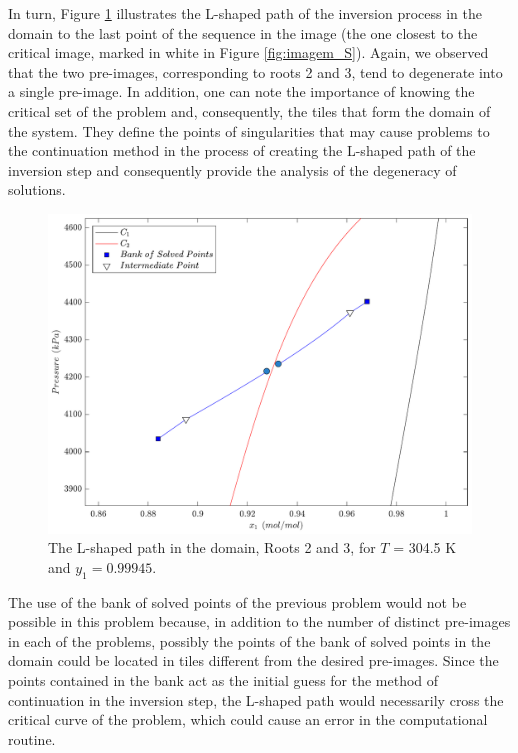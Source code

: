 \documentclass[journal=iecred,manuscript=article]{achemso}
\theoremstyle{definition}
\theoremstyle{remark}
\begin{document}
In turn, Figure \ref{fig:L_S} illustrates the L-shaped path of the inversion process in the domain to the last point of the sequence in the image (the one closest to the critical image, marked in white in Figure \ref{fig:imagem_S}). Again, we observed that the two pre-images, corresponding to roots 2 and 3, tend to degenerate into a single pre-image. In addition, one can note the importance of knowing the critical set of the problem and, consequently, the tiles that form the domain of the system. They define the points of singularities that may cause problems to the continuation method in the process of creating the L-shaped path of the inversion step and consequently provide the analysis of the degeneracy of solutions.

\begin{figure}[!ht]
	\begin{center}
		\includegraphics[scale=0.50]{caminhos_L_degeneracao_dominio2.pdf}
		\caption{The L-shaped path in the domain, Roots 2 and 3, for $T$ = 304.5 K and $y_1 = 0.99945$.}\label{fig:L_S}
	\end{center}
\end{figure}

The use of the bank of solved points of the previous problem would not be possible in this problem because, in addition to the number of distinct pre-images in each of the problems, possibly the points of the bank of solved points in the domain could be located in tiles different from the desired pre-images. Since the points contained in the bank act as the initial guess for the method of continuation in the inversion step, the L-shaped path would necessarily cross the critical curve of the problem, which could cause an error in the computational routine.
\end{document}

